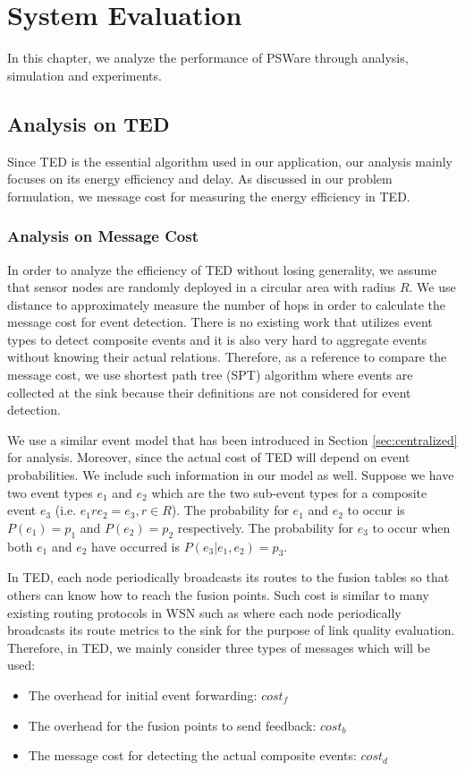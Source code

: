 \chapter{System Evaluation}
\label{chapter:evaluation}
In this chapter, we analyze the performance of PSWare through analysis, simulation and experiments.

\section{Analysis on TED}
\label{sec:ceduanalysis}
Since TED is the essential algorithm used in our application, our analysis mainly focuses on its energy efficiency and delay. As discussed in our problem formulation, we message cost for measuring the energy efficiency in TED.

\subsection{Analysis on Message Cost}
In order to analyze the efficiency of TED without losing generality, we assume that sensor nodes are randomly deployed in a circular area with radius \(R\). We use distance to approximately measure the number of hops in order to calculate the message cost for event detection. There is no existing work that utilizes event types to detect composite events and it is also very hard to aggregate events without knowing their actual relations. Therefore, as a reference to compare the message cost, we use shortest path tree (SPT) algorithm where events are collected at the sink because their definitions are not considered for event detection.


We use a similar event model that has been introduced in Section \ref{sec:centralized} for analysis. Moreover, since the actual cost of TED will depend on event probabilities. We include such information in our model as well. Suppose we have two event types \(e_1\) and \(e_2\) which are the two sub-event types for a composite event \(e_3\) (i.e. \(e_1re_2=e_3, r\in R\)). The probability for \(e_1\) and \(e_2\) to occur is \(P(e_1)=p_1\) and \(P(e_2)=p_2\) respectively. The probability for \(e_3\) to occur when both \(e_1\) and \(e_2\) have occurred is \(P(e_3|e_1, e_2)=p_3\).

In TED, each node periodically broadcasts its routes to the fusion tables so that others can know how to reach the fusion points. Such cost is similar to many existing routing protocols in WSN such as \cite{rssiroute} where each node periodically broadcasts its route metrics to the sink for the purpose of link quality evaluation. Therefore, in TED, we mainly consider three types of messages which will be used:
\begin{itemize}
\item The overhead for initial event forwarding: \(cost_f\)
\item The overhead for the fusion points to send feedback: \(cost_b\)
\item The message cost for detecting the actual composite events: \(cost_d\)
\end{itemize}

